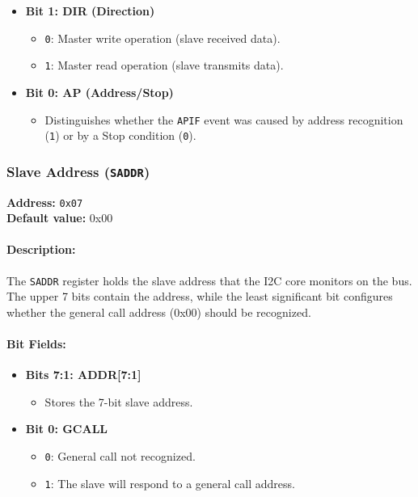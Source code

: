 \begin{itemize}[leftmargin=*,itemsep=2mm]
\begin{itemize}
        \end{itemize}
  \item \textbf{Bit 1: DIR (Direction)}  
        \begin{itemize}
          \item \texttt{0}: Master write operation (slave received data).
          \item \texttt{1}: Master read operation (slave transmits data).
        \end{itemize}
  \item \textbf{Bit 0: AP (Address/Stop)}  
        \begin{itemize}
          \item Distinguishes whether the \texttt{APIF} event was caused by address recognition (\texttt{1})
                or by a Stop condition (\texttt{0}).
        \end{itemize}
\end{itemize}

\vspace{2mm}

\subsubsection{Slave Address (\texttt{SADDR})}
\label{sec:saddr}

\textbf{Address:} \texttt{0x07} \\
\textbf{Default value:} 0x00

\paragraph{Description:}  
The \texttt{SADDR} register holds the slave address that the I2C core monitors on the bus. The upper 7 bits contain
the address, while the least significant bit configures whether the general call address (0x00) should be recognized.

\paragraph{Bit Fields:}
\begin{itemize}[leftmargin=*,itemsep=2mm]
  \item \textbf{Bits 7:1: ADDR[7:1]}  
        \begin{itemize}
          \item Stores the 7-bit slave address.
        \end{itemize}
  \item \textbf{Bit 0: GCALL}  
        \begin{itemize}
          \item \texttt{0}: General call not recognized.
          \item \texttt{1}: The slave will respond to a general call address.
        \end{itemize}
\end{itemize}

